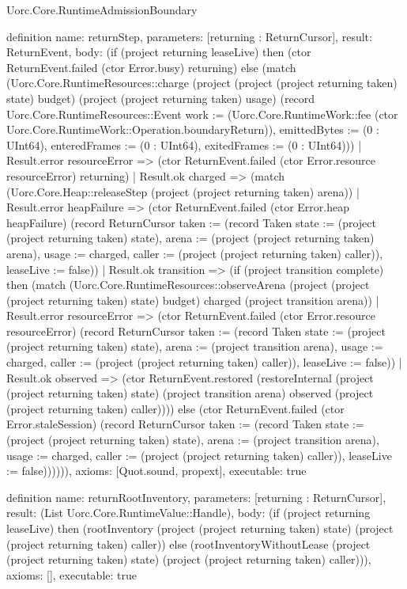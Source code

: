 \begin{lexlean}{Uorc.Core.RuntimeAdmissionBoundary}
\begin{semanticmodule}
definition{
  name: returnStep,
  parameters: [returning : ReturnCursor],
  result: ReturnEvent,
  body: (if (project returning leaseLive) then (ctor ReturnEvent.failed (ctor Error.busy) returning) else (match (Uorc.Core.RuntimeResources::charge (project (project (project returning taken) state) budget) (project (project returning taken) usage) (record Uorc.Core.RuntimeResources::Event {work := (Uorc.Core.RuntimeWork::fee (ctor Uorc.Core.RuntimeWork::Operation.boundaryReturn)), emittedBytes := (0 : UInt64), enteredFrames := (0 : UInt64), exitedFrames := (0 : UInt64)}))
    | Result.error resourceError => (ctor ReturnEvent.failed (ctor Error.resource resourceError) returning)
    | Result.ok charged => (match (Uorc.Core.Heap::releaseStep (project (project returning taken) arena))
      | Result.error heapFailure => (ctor ReturnEvent.failed (ctor Error.heap heapFailure) (record ReturnCursor {taken := (record Taken {state := (project (project returning taken) state), arena := (project (project returning taken) arena), usage := charged, caller := (project (project returning taken) caller)}), leaseLive := false}))
      | Result.ok transition => (if (project transition complete) then (match (Uorc.Core.RuntimeResources::observeArena (project (project (project returning taken) state) budget) charged (project transition arena))
        | Result.error resourceError => (ctor ReturnEvent.failed (ctor Error.resource resourceError) (record ReturnCursor {taken := (record Taken {state := (project (project returning taken) state), arena := (project transition arena), usage := charged, caller := (project (project returning taken) caller)}), leaseLive := false}))
        | Result.ok observed => (ctor ReturnEvent.restored (restoreInternal (project (project returning taken) state) (project transition arena) observed (project (project returning taken) caller)))) else (ctor ReturnEvent.failed (ctor Error.staleSession) (record ReturnCursor {taken := (record Taken {state := (project (project returning taken) state), arena := (project transition arena), usage := charged, caller := (project (project returning taken) caller)}), leaseLive := false})))))),
  axioms: [Quot.sound, propext],
  executable: true
}

definition{
  name: returnRootInventory,
  parameters: [returning : ReturnCursor],
  result: (List Uorc.Core.RuntimeValue::Handle),
  body: (if (project returning leaseLive) then (rootInventory (project (project returning taken) state) (project (project returning taken) caller)) else (rootInventoryWithoutLease (project (project returning taken) state) (project (project returning taken) caller))),
  axioms: [],
  executable: true
}


\end{semanticmodule}
\end{lexlean}
